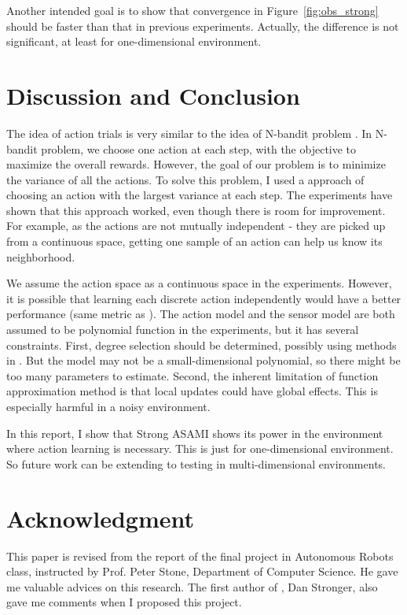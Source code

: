 \documentclass[12pt]{article}
\begin{document}
Another intended goal is to show that convergence in
Figure~\ref{fig:obs_strong} should be faster than that in previous
experiments. Actually, the difference is not significant, at least for
one-dimensional environment.

\section{Discussion and Conclusion}
\label{sec:dis}

The idea of action trials is very similar to the idea of N-bandit
problem \cite{vermorel2005multi}. In N-bandit problem, we choose one
action at each step, with the objective to maximize the overall
rewards. However, the goal of our problem is to minimize
the variance of all the actions. To solve this problem, I used a 
approach of 
choosing an action with the largest variance at each step. The
experiments have shown that this approach worked, even though there is
room for improvement. For example, as the actions are
not mutually independent - they are picked up from a continuous space,
getting one sample of an action can help us know its neighborhood.

We assume the action space as a continuous space in the experiments.
However, it is possible that learning each discrete action independently would
have a better performance (same metric as
\cite{LNAI2007-ahmadi}). The action model and the sensor model are
both assumed to be polynomial function in the experiments, but it has
several constraints. First, degree selection should be
determined, possibly using methods in \cite{IJAIT08-stronger}. But the
model may not be a small-dimensional polynomial, so there might be
too many parameters to estimate. Second, the inherent limitation of
function approximation method is that local updates could have global
effects. This is especially harmful in a noisy environment.

In this report, I show that Strong ASAMI shows its power in the
environment where action learning is necessary. This is just for
one-dimensional environment. So future work can be extending to
testing in multi-dimensional environments.

\section{Acknowledgment}

This paper is revised from the report of the final project in
Autonomous Robots class,
instructed by Prof. Peter Stone, Department of Computer Science. He
gave me valuable advices on this research. The first author of
\cite{CSJ06}, Dan Stronger, also gave me comments when I proposed this
project.




\end{document}
